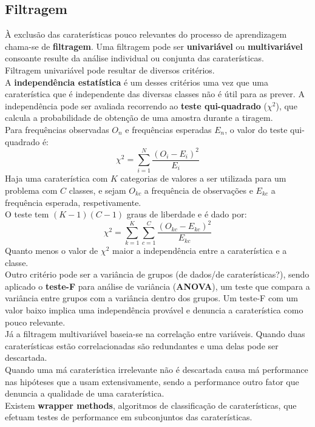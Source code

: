 \documentclass[]{report}
\begin{document}
\subsection{Filtragem}
À exclusão das caraterísticas pouco relevantes do processo de aprendizagem chama-se de \textbf{filtragem}. Uma filtragem pode ser \textbf{univariável} ou \textbf{multivariável} consoante resulte da análise individual ou conjunta das caraterísticas.\\[2mm]
Filtragem univariável pode resultar de diversos critérios.\\
A \textbf{independência estatística} é um desses critérios uma vez que uma caraterística que é independente das diversas classes não é útil para as prever. A independência pode ser avaliada recorrendo ao \textbf{teste qui-quadrado} ($\chi ^2$), que calcula a probabilidade de obtenção de uma amostra durante a tiragem.\\
Para frequências observadas $O_n$ e frequências esperadas $E_n$, o valor do teste qui-quadrado é:
$$\chi^2 = \sum_{i=1}^N \frac{(O_i - E_i)^2}{E_i}$$
Haja uma caraterística com $K$ categorias de valores a ser utilizada para um problema com $C$ classes, e sejam $O_{kc}$ a frequência de observações e $E_{kc}$ a frequência esperada, respetivamente.\\
O teste tem $(K-1)(C-1)$ graus de liberdade e é dado por:
$$\chi^2 = \sum_{k=1}^K \sum_{c=1}^C \frac{(O_{kc} - E_{kc})^2}{E_{kc}}$$
Quanto menos o valor de $\chi^2$ maior a independência entre a caraterística e a classe.\\[5mm]
Outro critério pode ser a variância de grupos (de dados/de caraterísticas?), sendo aplicado o \textbf{teste-F} para análise de variância (\textbf{ANOVA}), um teste que compara a variância entre grupos com a variância dentro dos grupos. Um teste-F com um valor baixo implica uma independência provável e denuncia a caraterística como pouco relevante.\\[2mm]
Já a filtragem multivariável baseia-se na correlação entre variáveis. Quando duas caraterísticas estão correlacionadas são redundantes e uma delas pode ser descartada.\\[2mm]
Quando uma má caraterística irrelevante não é descartada causa má performance nas hipóteses que a usam extensivamente, sendo a performance outro fator que denuncia a qualidade de uma caraterística. \\ Existem \textbf{wrapper methods}, algoritmos de classificação de caraterísticas, que efetuam testes de performance em subconjuntos das caraterísticas.\\
\end{document}

